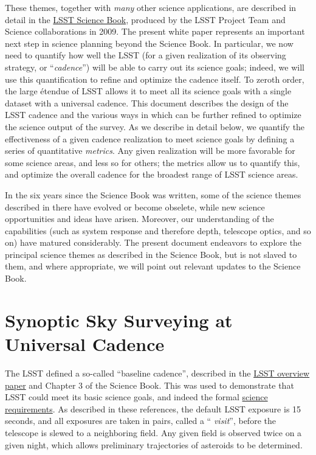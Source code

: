 These themes, together with {\em many} other science applications, are
described in detail in the
\href{http://lsst.org/scientists/scibook}{LSST Science Book}, produced
by the LSST Project Team and Science collaborations in 2009.  The
present white paper represents an important next step in science
planning beyond the Science Book.  In particular, we now need to
quantify how well the LSST (for a given realization of its observing
strategy, or ``{\em cadence}'') will be able to carry out its science
goals; indeed, we will use this quantification to refine and optimize
the cadence itself.  To zeroth order, the large \'etendue of LSST
allows it to meet all its science goals with a single dataset with a
universal cadence.  This document describes the design of the LSST
cadence and the various ways in which can be further refined to
optimize the science output of the survey.  As we describe in detail
below, we quantify the effectiveness of a given cadence realization to
meet science goals by defining a series of quantitative {\em metrics}.
Any given realization will be more favorable for some science areas,
and less so for others; the metrics allow us to quantify this, and
optimize the overall cadence for the broadest range of LSST science
areas.

In the six years since the Science Book was written, some of the
science themes described in there have evolved or become obselete,
while new science opportunities and ideas have arisen.  Moreover, our
understanding of the capabilities (such as system response and
therefore depth, telescope optics, and so on) have matured
considerably.  The present document endeavors to explore the principal
science themes as described in the Science Book, but is not slaved to
them, and where appropriate, we will point out relevant updates to the
Science Book.




\section{Synoptic Sky Surveying at Universal Cadence}
\def\secname{intro:baseline}\label{sec:\secname}

  The LSST defined a so-called ``baseline cadence'', described in the
  \href{http://adsabs.harvard.edu/abs/2008arXiv0805.2366I}{LSST
    overview paper} and Chapter 3 of the Science Book.  This was used
  to demonstrate that LSST could meet its basic science goals, and
  indeed the formal
  \href{https://www.lsstcorp.org/docushare/dsweb/Get/LPM-17}{science
    requirements}.    As
  described in these references, the default LSST exposure is 15
  seconds, and all exposures are taken in pairs, called a ``{\em
    visit}'', before the telescope is slewed to a neighboring field.
   Any given field is observed twice on a given night, which allows
   preliminary trajectories of asteroids to be determined.

